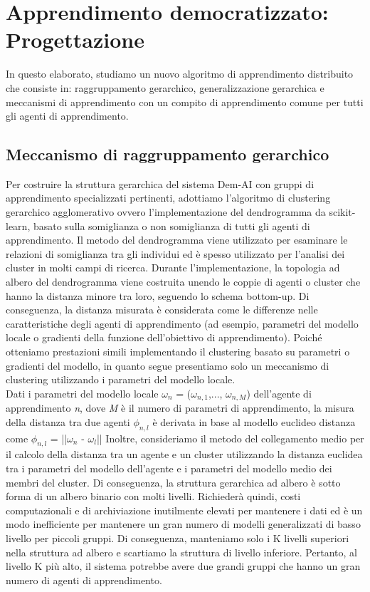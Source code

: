 \chapter{Apprendimento democratizzato: Progettazione}\label{ch:chapter3}
In questo elaborato, studiamo un nuovo algoritmo di apprendimento distribuito che consiste in: raggruppamento gerarchico, generalizzazione gerarchica e meccanismi di apprendimento con un compito di apprendimento comune per tutti gli agenti di apprendimento.

\section{Meccanismo di raggruppamento gerarchico}

Per costruire la struttura gerarchica del sistema Dem-AI con gruppi di apprendimento specializzati pertinenti, adottiamo l'algoritmo di clustering gerarchico agglomerativo ovvero l'implementazione del dendrogramma da scikit-learn, basato sulla somiglianza o non somiglianza di tutti gli agenti di apprendimento.
Il metodo del dendrogramma viene utilizzato per esaminare le relazioni di somiglianza tra gli individui ed è spesso utilizzato per l'analisi dei cluster in molti campi di ricerca. Durante l'implementazione, la topologia ad albero del dendrogramma viene costruita unendo le coppie di agenti o cluster che hanno la distanza minore tra loro, seguendo lo schema bottom-up. Di conseguenza, la distanza misurata è considerata come le differenze nelle caratteristiche degli agenti di apprendimento (ad esempio, parametri del modello locale o gradienti della funzione dell'obiettivo di apprendimento). Poiché otteniamo prestazioni simili implementando il clustering basato su parametri o gradienti del modello, in quanto segue presentiamo solo un meccanismo di clustering utilizzando i parametri del modello locale. \\
Dati i parametri del modello locale $\omega_n$ = ($\omega_{n,1}$,..., $\omega_{n,M}$) dell'agente di apprendimento \textsl{n}, dove \textsl{M} è il numero di parametri di apprendimento, la misura della distanza tra due agenti $\phi_{n,l}$ è derivata in base al modello euclideo distanza come $\phi_{n,l}$ =  ||$\omega_n$ - $\omega_l$|| 
Inoltre, consideriamo il metodo del collegamento medio per il calcolo della distanza tra un agente e un cluster utilizzando la distanza euclidea tra i parametri del modello dell'agente e i parametri del modello medio dei membri del cluster.
Di conseguenza, la struttura gerarchica ad albero è sotto forma di un albero binario con molti livelli. Richiederà quindi, costi computazionali e di archiviazione inutilmente elevati per mantenere i dati ed è un modo inefficiente per mantenere un gran numero di modelli generalizzati di basso livello per piccoli gruppi. Di conseguenza, manteniamo solo i K livelli superiori nella struttura ad albero e scartiamo la struttura di livello inferiore. Pertanto, al livello K più alto, il sistema potrebbe avere due grandi gruppi che hanno un gran numero di agenti di apprendimento.


